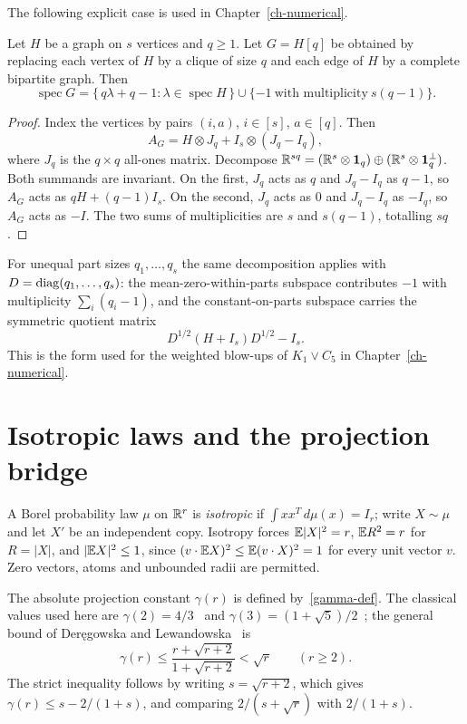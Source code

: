 The following explicit case is used in Chapter~\ref{ch-numerical}.
\begin{lemma}\label{blowup-spec}
Let $H$ be a graph on $s$ vertices and $q\ge1$. Let $G=H[q]$ be obtained by
replacing each vertex of $H$ by a clique of size $q$ and each edge of $H$ by a
complete bipartite graph. Then
\[
 \operatorname{spec}G=\{\,q\lambda+q-1:\lambda\in\operatorname{spec}H\,\}
   \cup\{-1\ \text{with multiplicity}\ s(q-1)\}.
\]
\end{lemma}
\begin{proof}
Index the vertices by pairs $(i,a)$, $i\in[s]$, $a\in[q]$. Then
\[
 A_G=H\otimes J_q+I_s\otimes(J_q-I_q),
\]
where $J_q$ is the $q\times q$ all-ones matrix. Decompose
$\mathbb R^{sq}=(\mathbb R^s\otimes\mathbf1_q)\oplus(\mathbb R^s\otimes\mathbf1_q^\perp)$. Both
summands are invariant. On the first, $J_q$ acts as $q$ and $J_q-I_q$ as
$q-1$, so $A_G$ acts as $qH+(q-1)I_s$. On the second, $J_q$ acts as $0$ and
$J_q-I_q$ as $-I_q$, so $A_G$ acts as $-I$. The two sums of multiplicities are
$s$ and $s(q-1)$, totalling $sq$.
\end{proof}
\begin{remark}\label{unequal-blowup}
For unequal part sizes $q_1,\ldots,q_s$ the same decomposition applies with
$D=\operatorname{diag}(q_1,\ldots,q_s)$: the mean-zero-within-parts subspace contributes
$-1$ with multiplicity $\sum_i(q_i-1)$, and the constant-on-parts subspace
carries the symmetric quotient matrix
\begin{equation}\label{quotient-unequal}
 D^{1/2}(H+I_s)D^{1/2}-I_s .
\end{equation}
This is the form used for the weighted blow-ups of $K_1\vee C_5$ in
Chapter~\ref{ch-numerical}.
\end{remark}

\section{Isotropic laws and the projection bridge}\label{sec-bridge}
A Borel probability law $\mu$ on $\mathbb R^r$ is \emph{isotropic} if
$\int xx^T\,d\mu(x)=I_r$; write $X\sim\mu$ and let $X'$ be an independent
copy. Isotropy forces $\mathbb E|X|^2=r$, $\mathbb E R^2=r$ for $R=|X|$, and
$|\mathbb E X|^2\le1$, since $(v\cdot\mathbb E X)^2\le\mathbb E(v\cdot X)^2=1$ for every unit
vector $v$. Zero vectors, atoms and unbounded radii are permitted.

The absolute projection constant $\gamma(r)$ is defined by~\eqref{gamma-def}.
The classical values used here are $\gamma(2)=4/3$~\cite{DL} and
$\gamma(3)=(1+\sqrt5)/2$~\cite{STW,DL}; the general bound of
Der\k{e}gowska and Lewandowska~\cite{DL} is
\begin{equation}\label{dl-bound}
 \gamma(r)\le\frac{r+\sqrt{r+2}}{1+\sqrt{r+2}}<\sqrt r
 \qquad(r\ge2).
\end{equation}
The strict inequality follows by writing $s=\sqrt{r+2}$, which gives
$\gamma(r)\le s-2/(1+s)$, and comparing $2/(s+\sqrt r)$ with $2/(1+s)$.


